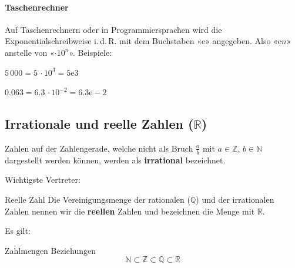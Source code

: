 

\paragraph{Taschenrechner} Auf Taschenrechnern oder in
Programmiersprachen wird die Exponentialschreibweise i.\,d.\,R. mit dem
Buchstaben «e» angegeben. Also «e$n$» anstelle von «$\cdot10^{n}$». Beispiele:

$5\,000 = 5\, \cdot 10^{3} = 5\mathrm{e}3$

$0.063 = 6.3\, \cdot 10^{-2} = 6.3\mathrm{e-}2$
\newpage

\subsection{Irrationale und reelle Zahlen ($\mathbb{R}$)}

  Zahlen auf der Zahlengerade, welche nicht als Bruch $\frac{a}{b}$ mit $a\in\mathbb{Z}$, $b \in \mathbb{N}$ dargestellt werden können, werden als \textbf{irrational} bezeichnet.

Wichtigste Vertreter:

\begin{center}
\end{center}

\begin{definition}{Reelle Zahl}{}
Die Vereinigungsmenge der rationalen ($\mathbb{Q}$) und der irrationalen Zahlen
nennen wir die \textbf{reellen} Zahlen und bezeichnen die Menge mit $\mathbb{R}$.
\end{definition}

Es gilt:

\begin{gesetz}{Zahlmengen Beziehungen}{}
$$\mathbb{N} \subset \mathbb{Z} \subset \mathbb{Q} \subset \mathbb{R} $$
\end{gesetz}


